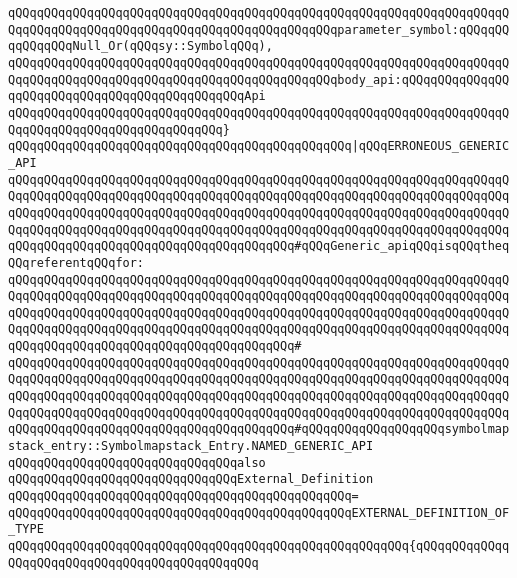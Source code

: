 \verb|qQQqqQQqqQQqqQQqqQQqqQQqqQQqqQQqqQQqqQQqqQQqqQQqqQQqqQQqqQQqqQQqqQQqqQQqqQQqqQQqqQQqqQQqqQQqqQQqqQQqqQQqqQQqqQQqqQQqparameter_symbol:qQQqqQQqqQQqqQQqNull_Or(qQQqsy::SymbolqQQq),|\newline
\verb|qQQqqQQqqQQqqQQqqQQqqQQqqQQqqQQqqQQqqQQqqQQqqQQqqQQqqQQqqQQqqQQqqQQqqQQqqQQqqQQqqQQqqQQqqQQqqQQqqQQqqQQqqQQqqQQqqQQqbody_api:qQQqqQQqqQQqqQQqqQQqqQQqqQQqqQQqqQQqqQQqqQQqqQQqApi|\newline
\verb|qQQqqQQqqQQqqQQqqQQqqQQqqQQqqQQqqQQqqQQqqQQqqQQqqQQqqQQqqQQqqQQqqQQqqQQqqQQqqQQqqQQqqQQqqQQqqQQqqQQq}|\newline
\verb|qQQqqQQqqQQqqQQqqQQqqQQqqQQqqQQqqQQqqQQqqQQqqQQq|\verb#|qQQqERRONEOUS_GENERIC_API#\newline
\verb|qQQqqQQqqQQqqQQqqQQqqQQqqQQqqQQqqQQqqQQqqQQqqQQqqQQqqQQqqQQqqQQqqQQqqQQqqQQqqQQqqQQqqQQqqQQqqQQqqQQqqQQqqQQqqQQqqQQqqQQqqQQqqQQqqQQqqQQqqQQqqQQqqQQqqQQqqQQqqQQqqQQqqQQqqQQqqQQqqQQqqQQqqQQqqQQqqQQqqQQqqQQqqQQqqQQqqQQqqQQqqQQqqQQqqQQqqQQqqQQqqQQqqQQqqQQqqQQqqQQqqQQqqQQqqQQqqQQqqQQqqQQqqQQqqQQqqQQqqQQqqQQqqQQqqQQqqQQqqQQq#qQQqGeneric_apiqQQqisqQQqtheqQQqreferentqQQqfor:|\newline
\verb|qQQqqQQqqQQqqQQqqQQqqQQqqQQqqQQqqQQqqQQqqQQqqQQqqQQqqQQqqQQqqQQqqQQqqQQqqQQqqQQqqQQqqQQqqQQqqQQqqQQqqQQqqQQqqQQqqQQqqQQqqQQqqQQqqQQqqQQqqQQqqQQqqQQqqQQqqQQqqQQqqQQqqQQqqQQqqQQqqQQqqQQqqQQqqQQqqQQqqQQqqQQqqQQqqQQqqQQqqQQqqQQqqQQqqQQqqQQqqQQqqQQqqQQqqQQqqQQqqQQqqQQqqQQqqQQqqQQqqQQqqQQqqQQqqQQqqQQqqQQqqQQqqQQqqQQqqQQqqQQq#|\newline
\verb|qQQqqQQqqQQqqQQqqQQqqQQqqQQqqQQqqQQqqQQqqQQqqQQqqQQqqQQqqQQqqQQqqQQqqQQqqQQqqQQqqQQqqQQqqQQqqQQqqQQqqQQqqQQqqQQqqQQqqQQqqQQqqQQqqQQqqQQqqQQqqQQqqQQqqQQqqQQqqQQqqQQqqQQqqQQqqQQqqQQqqQQqqQQqqQQqqQQqqQQqqQQqqQQqqQQqqQQqqQQqqQQqqQQqqQQqqQQqqQQqqQQqqQQqqQQqqQQqqQQqqQQqqQQqqQQqqQQqqQQqqQQqqQQqqQQqqQQqqQQqqQQqqQQqqQQqqQQqqQQq#qQQqqQQqqQQqqQQqqQQqsymbolmapstack_entry::Symbolmapstack_Entry.NAMED_GENERIC_API|\newline
\newline
\verb|qQQqqQQqqQQqqQQqqQQqqQQqqQQqqQQqalso|\newline
\verb|qQQqqQQqqQQqqQQqqQQqqQQqqQQqqQQqExternal_Definition|\newline
\verb|qQQqqQQqqQQqqQQqqQQqqQQqqQQqqQQqqQQqqQQqqQQqqQQq=|\newline
\verb|qQQqqQQqqQQqqQQqqQQqqQQqqQQqqQQqqQQqqQQqqQQqqQQqEXTERNAL_DEFINITION_OF_TYPE|\newline
\verb|qQQqqQQqqQQqqQQqqQQqqQQqqQQqqQQqqQQqqQQqqQQqqQQqqQQqqQQq{qQQqqQQqqQQqqQQqqQQqqQQqqQQqqQQqqQQqqQQqqQQqqQQq|\newline
